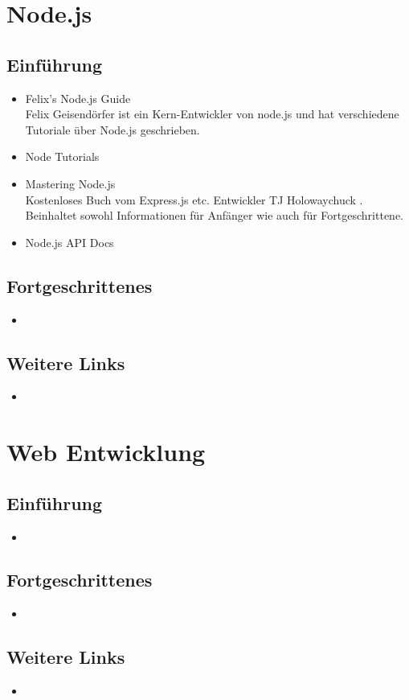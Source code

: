 \section{Node.js}
\label{sec:ti-nodejs}

\subsection*{Einführung}
\begin{itemize}
	\item Felix's Node.js Guide \cite{Nodeguide} \\
	Felix Geisendörfer ist ein Kern-Entwickler von node.js und hat verschiedene
	Tutoriale über Node.js geschrieben.
	\item Node Tutorials \cite{NodeTuts}
	\item Mastering Node.js \cite{MasteringNode} \\
	Kostenloses Buch vom Express.js \cite{Expressjs} etc. Entwickler TJ
	Holowaychuck \cite{TJH}. Beinhaltet sowohl Informationen für Anfänger wie
	auch für Fortgeschrittene.
	\item Node.js API Docs \cite{NodejsAPIDocs}
\end{itemize}

\subsection*{Fortgeschrittenes}
\begin{itemize}
	\item
\end{itemize}

\subsection*{Weitere Links}
\begin{itemize}
	\item
\end{itemize}

\section{Web Entwicklung}
\label{sec:ti-web-entwicklung}

\subsection*{Einführung}
\begin{itemize}
	\item
\end{itemize}

\subsection*{Fortgeschrittenes}
\begin{itemize}
	\item
\end{itemize}

\subsection*{Weitere Links}
\begin{itemize}
	\item
\end{itemize}